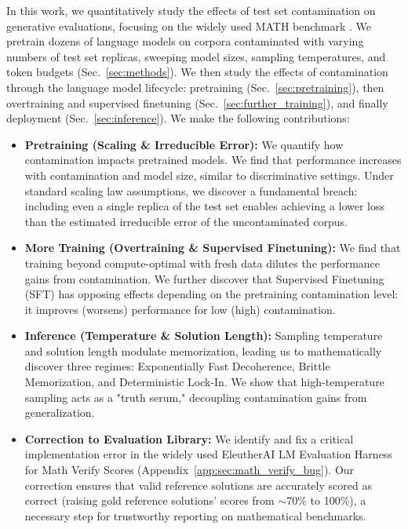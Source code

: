 In this work, we quantitatively study the effects of test set contamination on generative evaluations, focusing on the widely used MATH benchmark \citep{hendrycks2021measuringmathematicalproblemsolving}. 
We pretrain dozens of language models on corpora contaminated with varying numbers of test set replicas, sweeping model sizes, sampling temperatures, and token budgets (Sec.~\ref{sec:methods}). 
We then study the effects of contamination through the language model lifecycle: pretraining (Sec.~\ref{sec:pretraining}), then overtraining and supervised finetuning (Sec.~\ref{sec:further_training}), and finally deployment (Sec.~\ref{sec:inference}).
We make the following contributions:
%
\begin{itemize}
    \item \textbf{Pretraining (Scaling \& Irreducible Error):} We quantify how contamination impacts pretrained models. We find that performance increases with contamination and model size, similar to discriminative settings. Under standard scaling law assumptions, we discover a fundamental breach: including even a single replica of the test set enables achieving a lower loss than the estimated irreducible error of the uncontaminated corpus.
    
    \item \textbf{More Training (Overtraining \& Supervised Finetuning):} We find that training beyond compute-optimal with fresh data dilutes the performance gains from contamination. We further discover that Supervised Finetuning (SFT) has opposing effects depending on the pretraining contamination level: it improves (worsens) performance for low (high) contamination.

    \item \textbf{Inference (Temperature \& Solution Length):} Sampling temperature and solution length modulate memorization, leading us to mathematically discover three regimes: Exponentially Fast Decoherence, Brittle Memorization, and Deterministic Lock-In. We show that high-temperature sampling acts as a "truth serum," decoupling contamination gains from generalization.

    \item \textbf{Correction to Evaluation Library:} We identify and fix a critical implementation error in the widely used EleutherAI LM Evaluation Harness \citep{gao2024evalharness} for Math Verify Scores (Appendix~\ref{app:sec:math_verify_bug}). Our correction ensures that valid reference solutions are accurately scored as correct (raising gold reference solutions' scores from $\mathord{\sim}$70\% to 100\%), a necessary step for trustworthy reporting on mathematical benchmarks.
\end{itemize}

